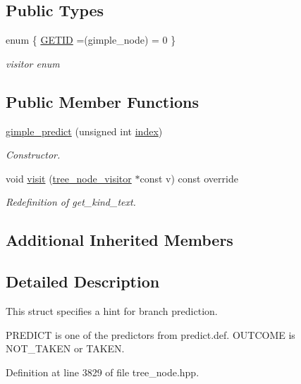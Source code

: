 \subsection*{Public Types}
\begin{DoxyCompactItemize}
\item 
enum \{ \hyperlink{structgimple__predict_aa912ea3fe76fe7e6bd57f9e2128c77efa16b1251d8d9c50d14c99e8e7c89cb55b}{G\+E\+T\+ID} =(gimple\+\_\+node) = 0
 \}\begin{DoxyCompactList}\small\item\em visitor enum \end{DoxyCompactList}
\end{DoxyCompactItemize}
\subsection*{Public Member Functions}
\begin{DoxyCompactItemize}
\item 
\hyperlink{structgimple__predict_ad7947ac858145d0aa8c8571dd8011a86}{gimple\+\_\+predict} (unsigned int \hyperlink{classtree__node_ac036ae7a6a4594d3052b9a29045464ca}{index})
\begin{DoxyCompactList}\small\item\em Constructor. \end{DoxyCompactList}\item 
void \hyperlink{structgimple__predict_af7e0810d1e453a5f90ceefaaa4d2c1f3}{visit} (\hyperlink{classtree__node__visitor}{tree\+\_\+node\+\_\+visitor} $\ast$const v) const override
\begin{DoxyCompactList}\small\item\em Redefinition of get\+\_\+kind\+\_\+text. \end{DoxyCompactList}\end{DoxyCompactItemize}
\subsection*{Additional Inherited Members}


\subsection{Detailed Description}
This struct specifies a hint for branch prediction. 

P\+R\+E\+D\+I\+CT is one of the predictors from predict.\+def. O\+U\+T\+C\+O\+ME is N\+O\+T\+\_\+\+T\+A\+K\+EN or T\+A\+K\+EN. 

Definition at line 3829 of file tree\+\_\+node.\+hpp.



